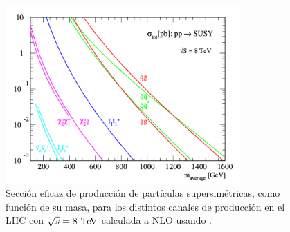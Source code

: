 \begin{figure}[h]
  \centering
  \includegraphics[width=0.8\textwidth]{figures/susy_lhc_xs_8tev}
  \caption{Sección eficaz de producción de partículas supersimétricas, como
    función de su masa, para los distintos canales de producción en el LHC con
    $\sqrt{s} = 8 \tev$ calculada a NLO usando \prospino.}
  \label{fig:xs_lhc_8tev}
\end{figure}
